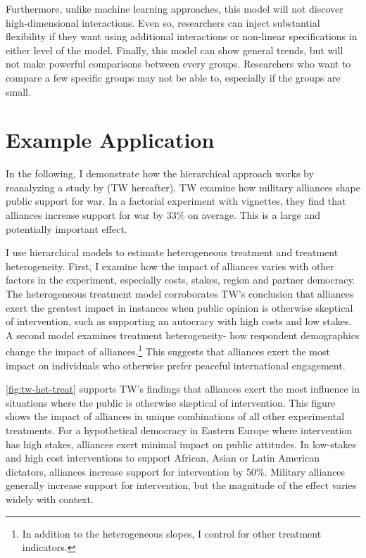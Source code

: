 \documentclass[12pt]{article}
\begin{document}
Furthermore, unlike machine learning approaches, this model will not discover high-dimensional interactions. 
Even so, researchers can inject substantial flexibility if they want using additional interactions or non-linear specifications in either level of the model. 
Finally, this model can show general trends, but will not make powerful comparisons between every groups. 
Researchers who want to compare a few specific groups may not be able to, especially if the groups are small.



\section{Example Application} 


In the following, I demonstrate how the hierarchical approach works by reanalyzing a study by \citet{TomzWeeks2021} (TW hereafter). 
TW examine how military alliances shape public support for war.
In a factorial experiment with vignettes, they find that alliances increase support for war by 33\% on average. 
This is a large and potentially important effect. 


I use hierarchical models to estimate heterogeneous treatment and treatment heterogeneity. 
First, I examine how the impact of alliances varies with other factors in the experiment, especially costs, stakes, region and partner democracy.
The heterogeneous treatment model corroborates TW's conclusion that alliances exert the greatest impact in instances when public opinion is otherwise skeptical of intervention, such as supporting an autocracy with high costs and low stakes.  
A second model examines treatment heterogeneity- how respondent demographics change the impact of alliances.\footnote{In addition to the heterogeneous slopes, I control for other treatment indicators.}
This suggests that alliances exert the most impact on individuals who otherwise prefer peaceful international engagement.  


\autoref{fig:tw-het-treat} supports TW's findings that alliances exert the most influence in situations where the public is otherwise skeptical of intervention. 
This figure shows the impact of alliances in unique combinations of all other experimental treatments. 
For a hypothetical democracy in Eastern Europe where intervention has high stakes, alliances exert minimal impact on public attitudes. 
In low-stakes and high cost interventions to support African, Asian or Latin American dictators, alliances increase support for intervention by 50\%. 
Military alliances generally increase support for intervention, but the magnitude of the effect varies widely with context. 
\end{document}
